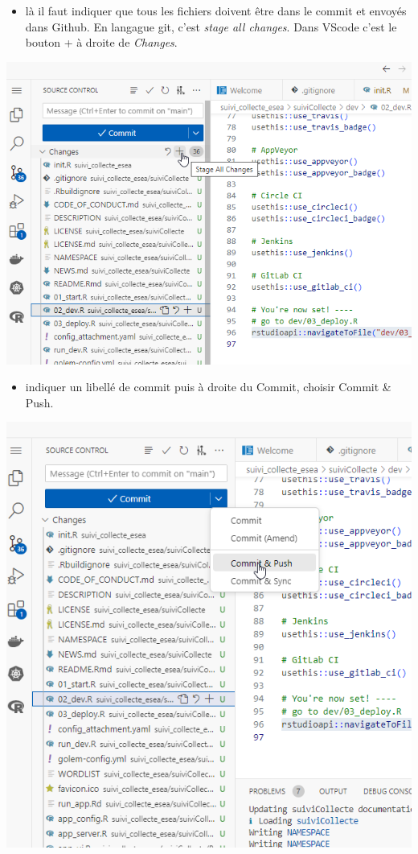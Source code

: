 \documentclass[
  letterpaper,
  DIV=11,
  numbers=noendperiod]{scrreprt}
\providecommand{\tightlist}{%
  \setlength{\itemsep}{0pt}\setlength{\parskip}{0pt}}\usepackage{longtable,booktabs,array}
\begin{document}
\begin{itemize}
\tightlist
\item
  là il faut indiquer que tous les fichiers doivent être dans le commit
  et envoyés dans Github. En langague git, c'est \emph{stage all
  changes}. Dans VScode c'est le bouton + à droite de \emph{Changes}.
\end{itemize}

\includegraphics{./images/vscode_stade_all_changes.png}

\begin{itemize}
\tightlist
\item
  indiquer un libellé de commit puis à droite du Commit, choisir Commit
  \& Push.
\end{itemize}

\includegraphics{./images/golem_commit_and_push.png}
\end{document}
